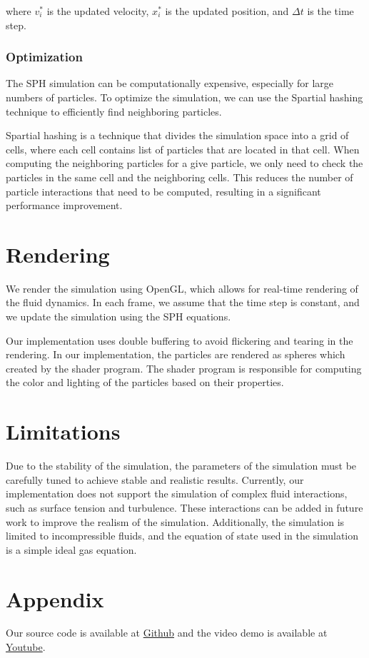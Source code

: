 \documentclass[a4paper]{article}
\begin{document}
where $v_i^*$ is the updated velocity, $x_i^*$ is the updated position, and $\Delta t$ is the time step.

\subsubsection{Optimization}

The SPH simulation can be computationally expensive, especially for large numbers of particles.
To optimize the simulation, we can use the Spartial hashing technique to efficiently find neighboring particles.

Spartial hashing is a technique that divides the simulation space into a grid of cells, where each cell contains list of particles that are located in that cell.
When computing the neighboring particles for a give particle, we only need to check the particles in the same cell and the neighboring cells.
This reduces the number of particle interactions that need to be computed, resulting in a significant performance improvement.

\section{Rendering}

We render the simulation using OpenGL, which allows for real-time rendering of the fluid dynamics.
In each frame, we assume that the time step is constant, and we update the simulation using the SPH equations.

\medskip

Our implementation uses double buffering to avoid flickering and tearing in the rendering.
In our implementation, the particles are rendered as spheres which created by the shader program.
The shader program is responsible for computing the color and lighting of the particles based on their properties.

\section{Limitations}

Due to the stability of the simulation, the parameters of the simulation must be carefully tuned to achieve stable and realistic results.
Currently, our implementation does not support the simulation of complex fluid interactions, such as surface tension and turbulence.
These interactions can be added in future work to improve the realism of the simulation.
Additionally, the simulation is limited to incompressible fluids, and the equation of state used in the simulation is a simple ideal gas equation.

\nocite{*}
\printbibliography

\section*{Appendix}

Our source code is available at \href{https://github.com/MasterIceZ/SPH-FluidSimulation}{Github} and the video demo is available at \href{https://youtube.com}{Youtube}.
\end{document}
